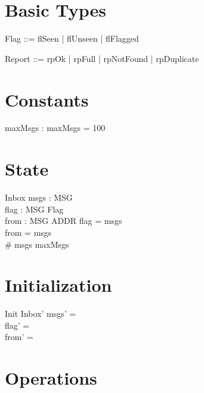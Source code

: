 \documentclass{article}
\begin{document}
\section{Basic Types}

\begin{zed}
\end{zed}

\begin{zed}
  Flag ::= flSeen | flUnseen | flFlagged
\end{zed}

\begin{zed}
  Report ::= rpOk | rpFull | rpNotFound | rpDuplicate
\end{zed}

\section{Constants}

\begin{axdef}
  maxMsgs : \nat
\where
  maxMsgs = 100
\end{axdef}

\section{State}

\begin{schema}{Inbox}
  msgs : \power MSG \\
  flag : MSG \pfun Flag \\
  from : MSG \pfun ADDR
\where
  \dom flag = msgs \\
  \dom from = msgs \\
  \# msgs \leq maxMsgs
\end{schema}

\section{Initialization}

\begin{schema}{Init}
  Inbox'
\where
  msgs' = \emptyset \\
  flag' = \emptyset \\
  from' = \emptyset
\end{schema}

\section{Operations}
\end{document}
